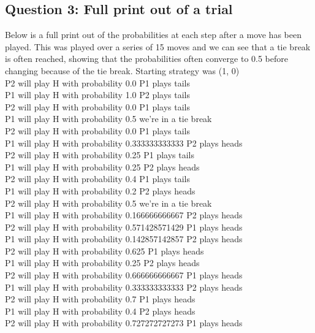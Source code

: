 \documentclass[11pt]{article}
\begin{document}
\subsection{Question 3: Full print out of a trial}
Below is a full print out of the probabilities at each step after a move has been played. This was played over a series of 15 moves and we can see that a tie break is often reached, showing that the probabilities often converge to 0.5 before changing because of the tie break. Starting strategy was (1, 0) \\

P2 will play H with probability 0.0  P1 plays tails \\
P1 will play H with probability 1.0  P2 plays tails\\
P2 will play H with probability 0.0  P1 plays tails\\
P1 will play H with probability 0.5  we're in a tie break\\
P2 will play H with probability 0.0  P1 plays tails\\
P1 will play H with probability 0.333333333333  P2 plays heads\\
P2 will play H with probability 0.25  P1 plays tails\\
P1 will play H with probability 0.25  P2 plays heads\\
P2 will play H with probability 0.4  P1 plays tails\\
P1 will play H with probability 0.2  P2 plays heads\\
P2 will play H with probability 0.5  we're in a tie break\\
P1 will play H with probability 0.166666666667  P2 plays heads\\
P2 will play H with probability 0.571428571429  P1 plays heads\\
P1 will play H with probability 0.142857142857  P2 plays heads\\
P2 will play H with probability 0.625  P1 plays heads\\
P1 will play H with probability 0.25  P2 plays heads\\
P2 will play H with probability 0.666666666667  P1 plays heads\\
P1 will play H with probability 0.333333333333  P2 plays heads\\
P2 will play H with probability 0.7  P1 plays heads\\
P1 will play H with probability 0.4  P2 plays heads\\
P2 will play H with probability 0.727272727273  P1 plays heads\\
\end{document}
